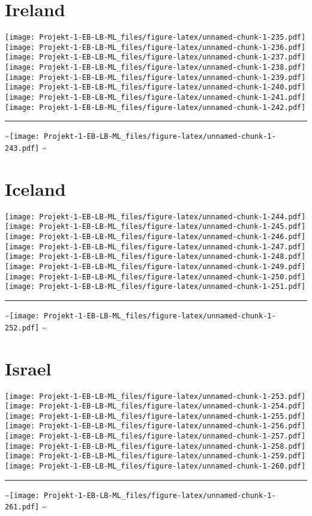 \documentclass[]{article}
\begin{document}
\section{Ireland}\label{ireland}

\texttt{[image: Projekt-1-EB-LB-ML\_files/figure-latex/unnamed-chunk-1-235.pdf]}
\texttt{[image: Projekt-1-EB-LB-ML\_files/figure-latex/unnamed-chunk-1-236.pdf]}
\texttt{[image: Projekt-1-EB-LB-ML\_files/figure-latex/unnamed-chunk-1-237.pdf]}
\texttt{[image: Projekt-1-EB-LB-ML\_files/figure-latex/unnamed-chunk-1-238.pdf]}
\texttt{[image: Projekt-1-EB-LB-ML\_files/figure-latex/unnamed-chunk-1-239.pdf]}
\texttt{[image: Projekt-1-EB-LB-ML\_files/figure-latex/unnamed-chunk-1-240.pdf]}
\texttt{[image: Projekt-1-EB-LB-ML\_files/figure-latex/unnamed-chunk-1-241.pdf]}
\texttt{[image: Projekt-1-EB-LB-ML\_files/figure-latex/unnamed-chunk-1-242.pdf]}
\bigskip\hrule\bigskip
\textasciitilde{}\hfill\texttt{[image: Projekt-1-EB-LB-ML\_files/figure-latex/unnamed-chunk-1-243.pdf]}
\hfill \textasciitilde{} \vfill\eject

\section{Iceland}\label{iceland}

\texttt{[image: Projekt-1-EB-LB-ML\_files/figure-latex/unnamed-chunk-1-244.pdf]}
\texttt{[image: Projekt-1-EB-LB-ML\_files/figure-latex/unnamed-chunk-1-245.pdf]}
\texttt{[image: Projekt-1-EB-LB-ML\_files/figure-latex/unnamed-chunk-1-246.pdf]}
\texttt{[image: Projekt-1-EB-LB-ML\_files/figure-latex/unnamed-chunk-1-247.pdf]}
\texttt{[image: Projekt-1-EB-LB-ML\_files/figure-latex/unnamed-chunk-1-248.pdf]}
\texttt{[image: Projekt-1-EB-LB-ML\_files/figure-latex/unnamed-chunk-1-249.pdf]}
\texttt{[image: Projekt-1-EB-LB-ML\_files/figure-latex/unnamed-chunk-1-250.pdf]}
\texttt{[image: Projekt-1-EB-LB-ML\_files/figure-latex/unnamed-chunk-1-251.pdf]}
\bigskip\hrule\bigskip
\textasciitilde{}\hfill\texttt{[image: Projekt-1-EB-LB-ML\_files/figure-latex/unnamed-chunk-1-252.pdf]}
\hfill \textasciitilde{} \vfill\eject

\section{Israel}\label{israel}

\texttt{[image: Projekt-1-EB-LB-ML\_files/figure-latex/unnamed-chunk-1-253.pdf]}
\texttt{[image: Projekt-1-EB-LB-ML\_files/figure-latex/unnamed-chunk-1-254.pdf]}
\texttt{[image: Projekt-1-EB-LB-ML\_files/figure-latex/unnamed-chunk-1-255.pdf]}
\texttt{[image: Projekt-1-EB-LB-ML\_files/figure-latex/unnamed-chunk-1-256.pdf]}
\texttt{[image: Projekt-1-EB-LB-ML\_files/figure-latex/unnamed-chunk-1-257.pdf]}
\texttt{[image: Projekt-1-EB-LB-ML\_files/figure-latex/unnamed-chunk-1-258.pdf]}
\texttt{[image: Projekt-1-EB-LB-ML\_files/figure-latex/unnamed-chunk-1-259.pdf]}
\texttt{[image: Projekt-1-EB-LB-ML\_files/figure-latex/unnamed-chunk-1-260.pdf]}
\bigskip\hrule\bigskip
\textasciitilde{}\hfill\texttt{[image: Projekt-1-EB-LB-ML\_files/figure-latex/unnamed-chunk-1-261.pdf]}
\hfill \textasciitilde{} \vfill\eject
\end{document}
